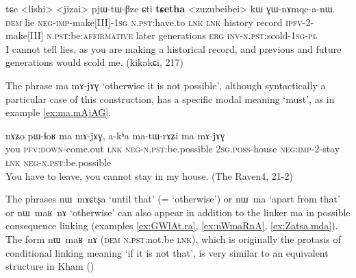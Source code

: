 \documentclass[oldfontcommands,oneside,a4paper,11pt]{article}
\newcommand{\ipa}[1]{{\phon \mbox{#1}}} %
\begin{document}
\begin{exe}
\ex \label{ex:matABzea}
\gll 
[\ipa{nɯ}    	\ipa{kʰramba}    	\ipa{ma-tɤ-βze-a}    	\ipa{ra}]    	\ipa{\textbf{ma}}    	\ipa{tɕe}    	<lishi>    	<jizai>    	\ipa{pjɯ-tɯ-βze}    	\ipa{ɕti}    	    	\ipa{\textbf{tɕetha}}    		     <zuzubeibei>    	\ipa{kɯ}    	\ipa{ɣɯ-nɤmqe-a-nɯ.}    \\
\textsc{dem}  lie \textsc{neg-imp}-make[III]-\textsc{1sg} \textsc{n.pst}:have.to \textsc{lnk} \textsc{lnk}   history record \textsc{ipfv}-2-make[III] \textsc{n.pst}:be:\textsc{affirmative} later generations \textsc{erg}  \textsc{inv-n.pst}:scold-\textsc{1sg-pl} \\
\glt I cannot tell lies, as   you are making a historical record, and previous and future generations would scold me.  (kikakɕi, 217)
 \end{exe}

The phrase \ipa{ma}  	\ipa{mɤ-jɤɣ} `otherwise it is not possible', although syntactically a particular case of this construction, has a specific modal meaning `must', as in example \ref{ex:ma.mAjAG}.


\begin{exe}
\ex \label{ex:ma.mAjAG}
\gll 
\ipa{nɤʑo}  	\ipa{pɯ-ɬoʁ}  	\ipa{ma}  	\ipa{mɤ-jɤɣ,}  	\ipa{a-kʰa}  	\ipa{ma-tɯ-rɤʑi}  	\ipa{ma}  	\ipa{mɤ-jɤɣ}  \\
you \textsc{pfv:down}-come.out \textsc{lnk} \textsc{neg-n.pst}:be.possible \textsc{2sg.poss}-house \textsc{neg:imp}-2-stay \textsc{lnk} \textsc{neg-n.pst}:be.possible \\
\glt You have to leave, you cannot stay in my house. (The Raven4, 21-2)
 \end{exe}


The phrases \ipa{nɯ mɤɕtʂa} `until that' (= `otherwise') or \ipa{nɯ ma} `apart from that' or \ipa{nɯ maʁ nɤ} `otherwise' can also appear in addition to the linker \ipa{ma} in possible consequence linking (examples \ref{ex:GWlAt.ra}, \ref{ex:nWmaRnA}, \ref{ex:Zatsa.mda}). The form \ipa{nɯ maʁ nɤ} (\textsc{dem} \textsc{n.pst}:not.be \textsc{lnk}), which is originally the protasis of conditional linking meaning `if it is not that', is very similar to an equivalent structure in Kham (\citealt[112]{watters09kham})
 
\end{document}

